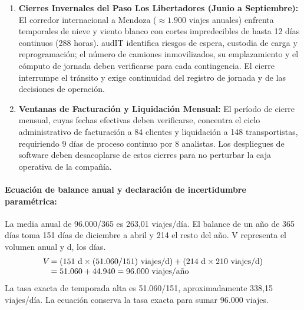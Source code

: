 \begin{enumerate}
\begin{itemize}
  \end{itemize}
  \item \textbf{Cierres Invernales del Paso Los Libertadores (Junio a Septiembre):} El corredor internacional a Mendoza ($\approx 1.900$ viajes anuales) enfrenta temporales de nieve y viento blanco con cortes impredecibles de hasta 12 días continuos (288 horas). audIT identifica riesgos de espera, custodia de carga y reprogramación; el número de camiones inmovilizados, su emplazamiento y el cómputo de jornada deben verificarse para cada contingencia. El cierre interrumpe el tránsito y exige continuidad del registro de jornada y de las decisiones de operación.
  \item \textbf{Ventanas de Facturación y Liquidación Mensual:} El período de cierre mensual, cuyas fechas efectivas deben verificarse, concentra el ciclo administrativo de facturación a 84 clientes y liquidación a 148 transportistas, requiriendo 9 días de proceso continuo por 8 analistas. Los despliegues de software deben desacoplarse de estos cierres para no perturbar la caja operativa de la compañía.
\end{enumerate}

\paragraph{Ecuación de balance anual y declaración de incertidumbre paramétrica:}
La media anual de 96.000/365 es 263,01 viajes/día. El balance de un año de 365 días toma 151 días de diciembre a abril y 214 el resto del año. V representa el volumen anual y d, los días.
\begin{equation}
  \begin{array}{r@{\,}l}
    V & = (151\text{ d} \times (51.060/151)\text{ viajes/d}) + (214\text{ d} \times 210\text{ viajes/d}) \\
                    & = 51.060 + 44.940 = 96.000\text{ viajes/año}
  \end{array}
\end{equation}
La tasa exacta de temporada alta es 51.060/151, aproximadamente 338,15 viajes/día. La ecuación conserva la tasa exacta para sumar 96.000 viajes.

